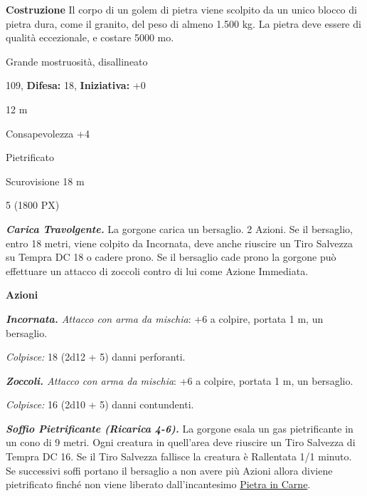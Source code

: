 \begin{multicols}{2}
{\textbf{Costruzione}
Il corpo di un golem di pietra viene scolpito da un unico blocco di pietra dura, come il granito, del peso di almeno 1.500 kg. La pietra deve essere di qualità eccezionale, e costare 5000 mo.

\noindent
\begin{description}[noitemsep, topsep=0pt, parsep=0pt, partopsep=0pt, leftmargin=0cm, labelwidth=2.2cm]
	\item[\textbf{Taglia/Tipo:}] Grande mostruosità, disallineato
	\item[\textbf{Caratt.:}] 
	\item[\textbf{Punti Ferita:}] 109,  \textbf{Difesa:} 18,  \textbf{Iniziativa:} +0
	\item[\textbf{Movimento:}] 12 m
	\item[\textbf{Tiri Salvez.:}] 
	\item[\textbf{Comp.:}] Consapevolezza +4
	\item[\textbf{Immunità:}] Pietrificato
	\item[\textbf{Sensi:}] Scurovisione 18 m
	\item[\textbf{Sfida:}] 5 (1800 PX)\smallskip
\end{description}

\emph{\textbf{Carica Travolgente.}} La gorgone carica un bersaglio. 2 Azioni. Se il bersaglio, entro 18 metri, viene colpito da Incornata, deve anche riuscire un Tiro Salvezza su Tempra DC 18 o cadere prono. Se il bersaglio cade prono la gorgone può effettuare un attacco di zoccoli contro di lui come Azione Immediata.

\textbf{Azioni}

\emph{\textbf{Incornata.} Attacco con arma da mischia}: +6 a colpire, portata 1 m, un bersaglio.

\emph{Colpisce:} 18 (2d12 + 5) danni perforanti.

\emph{\textbf{Zoccoli.} Attacco con arma da mischia}: +6 a colpire, portata 1 m, un bersaglio.

\emph{Colpisce:} 16 (2d10 + 5) danni contundenti.

\emph{\textbf{Soffio Pietrificante (Ricarica 4-6).}} La gorgone esala un gas pietrificante in un cono di 9 metri. Ogni creatura in quell'area deve riuscire un Tiro Salvezza di Tempra DC 16. Se il Tiro Salvezza fallisce la creatura è Rallentata 1/1 minuto. Se successivi soffi portano il bersaglio a non avere più Azioni allora diviene pietrificato finché non viene liberato dall'incantesimo \hyperlink{Pietra in Carne}{Pietra in Carne}.

}
\end{multicols}
